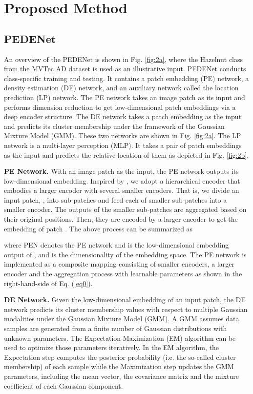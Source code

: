 \documentclass{article}
\begin{document}
\section{Proposed Method}\label{sec:method}

\subsection{PEDENet}\label{subsec:PEDENet}

An overview of the PEDENet is shown in Fig. \ref{fig:2a}, where the
Hazelnut class from the MVTec AD dataset is used as an illustrative input. 
PEDENet conducts class-specific training and testing.  It contains a
patch embedding (PE) network, a density estimation (DE) network, and an
auxiliary network called the location prediction (LP) network.  The PE
network takes an image patch as its input and performs dimension
reduction to get low-dimensional patch embeddings via a deep encoder
structure. The DE network takes a patch embedding as the input and
predicts its cluster membership under the framework of the Gaussian
Mixture Model (GMM).  These two networks are shown in Fig.
\ref{fig:2a}.  The LP network is a multi-layer perception (MLP).  It
takes a pair of patch embeddings as the input and predicts the relative
location of them as depicted in Fig. \ref{fig:2b}. 


{\bf PE Network.} With an image patch as the input, the PE network
outputs its low-dimensional embedding.  Inspired by \cite{yi2020patch},
we adopt a hierarchical encoder that embodies a larger encoder with
several smaller encoders. That is, we divide an input patch, , into
 sub-patches and feed each of smaller sub-patches into a
smaller encoder.  The outputs of the smaller sub-patches are aggregated
based on their original positions. Then, they are encoded by a larger
encoder to get the embedding of patch .  The above process can be
summarized as

where PEN denotes the PE network and  is the 
low-dimensional embedding output of , and  is the dimensionality 
of the embedding space. The PE network is implemented as a composite
mapping consisting of smaller encoders, a larger encoder and the
aggregation process with learnable parameters 
as shown in the right-hand-side of Eq. (\ref{eq0}).



{\bf DE Network.} Given the low-dimensional embedding of an input patch,
the DE network predicts its cluster membership values with respect to
multiple Gaussian modalities under the Gaussian Mixture Model (GMM).  A
GMM assumes data samples are generated from a finite number of Gaussian
distributions with unknown parameters.  The Expectation-Maximization
(EM) algorithm can be used to optimize those parameters iteratively. In
the EM algorithm, the Expectation step computes the posterior
probability (i.e. the so-called cluster membership) of each sample while
the Maximization step updates the GMM parameters, including the mean
vector, the covariance matrix and the mixture coefficient of each
Gaussian component. 
\end{document}
